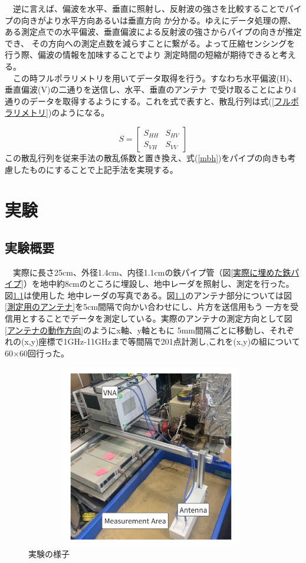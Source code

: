 \documentclass[12pt,a4paper]{jsreport}
\begin{document}
　逆に言えば、偏波を水平、垂直に照射し、反射波の強さを比較することでパイプの向きがより水平方向あるいは垂直方向
か分かる。ゆえにデータ処理の際、ある測定点での水平偏波、垂直偏波による反射波の強さからパイプの向きが推定でき、
その方向への測定点数を減らすことに繋がる。よって圧縮センシングを行う際、偏波の情報を加味することでより
測定時間の短縮が期待できると考える。
\\　この時フルポラリメトリを用いてデータ取得を行う。すなわち水平偏波(H)、垂直偏波(V)の二通りを送信し、水平、垂直のアンテナ
で受け取ることにより4通りのデータを取得するようにする。これを式で表すと、散乱行列は式(\ref{フルポラリメトリ})のようになる。

\begin{equation}
  S =
      \left[
      \begin{array}{rrr}
      S_{HH} & S_{HV}  \\
      S_{VH} & S_{VV} 
      
      \end{array}
      \right]\label{フルポラリメトリ}
  \end{equation}
この散乱行列を従来手法の散乱係数と置き換え、式(\ref{mbh})をパイプの向きも考慮したものにすることで上記手法を実現する。

\chapter{実験}
\section{実験概要}
　実際に長さ25cm、外径1.4cm、内径1.1cmの鉄パイプ管（図\ref{実際に埋めた鉄パイプ}）を地中約8cmのところに埋設し、地中レーダを照射し、測定を行った。図\ref{実験の様子}は使用した
地中レーダの写真である。図\ref{実験の様子}のアンテナ部分については図\ref{測定用のアンテナ}を5cm間隔で向かい合わせにし、片方を送信用もう
一方を受信用とすることでデータを測定している。実際のアンテナの測定方向として図\ref{アンテナの動作方向}のようにx軸、y軸ともに
5mm間隔ごとに移動し、それぞれの(x,y)座標で1GHz-11GHzまで等間隔で201点計測し,これを(x,y)の組について60×60回行った。

\begin{figure}[h]
  \begin{center}
   \includegraphics[height=8cm,width=11cm]{./image/Exp_Situ.pdf}
  \caption{実験の様子}\label{実験の様子}
  \end{center}
  \end{figure}
\end{document}
